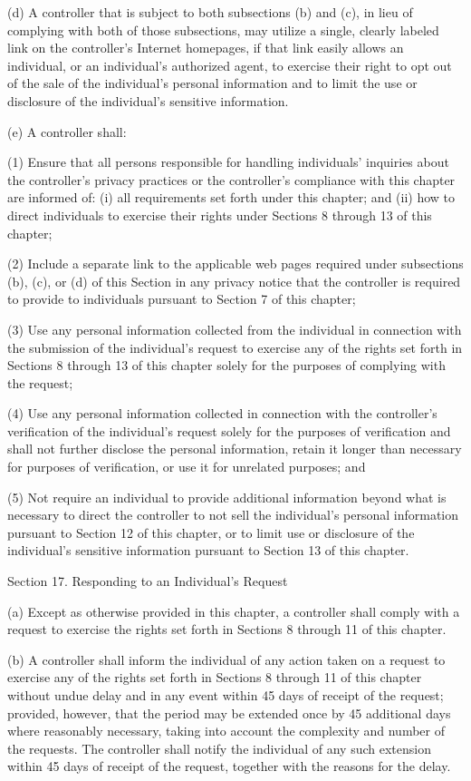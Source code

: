 (d) A controller that is subject to both subsections (b) and (c), in lieu of complying with both of those subsections, may utilize a single, clearly labeled link on the controller’s Internet homepages, if that link easily allows an individual, or an individual’s authorized agent, to exercise their right to opt out of the sale of the individual’s personal information and to limit the use or disclosure of the individual’s sensitive information. 

(e) A controller shall:

(1) Ensure that all persons responsible for handling individuals’ inquiries about the controller’s privacy practices or the controller’s compliance with this chapter are informed of: (i) all requirements set forth under this chapter; and (ii) how to direct individuals to exercise their rights under Sections 8 through 13 of this chapter;

(2) Include a separate link to the applicable web pages required under subsections (b), (c), or (d) of this Section in any privacy notice that the controller is required to provide to individuals pursuant to Section 7 of this chapter;

(3) Use any personal information collected from the individual in connection with the submission of the individual’s request to exercise any of the rights set forth in Sections 8 through 13 of this chapter solely for the purposes of complying with the request;

(4) Use any personal information collected in connection with the controller’s verification of the individual’s request solely for the purposes of verification and shall not further disclose the personal information, retain it longer than necessary for purposes of verification, or use it for unrelated purposes; and

(5) Not require an individual to provide additional information beyond what is necessary to direct the controller to not sell the individual’s personal information pursuant to Section 12 of this chapter, or to limit use or disclosure of the individual’s sensitive information pursuant to Section 13 of this chapter.

Section 17. Responding to an Individual’s Request

(a) Except as otherwise provided in this chapter, a controller shall comply with a request to exercise the rights set forth in Sections 8 through 11 of this chapter.

(b) A controller shall inform the individual of any action taken on a request to exercise any of the rights set forth in Sections 8 through 11 of this chapter without undue delay and in any event within 45 days of receipt of the request; provided, however, that the period may be extended once by 45 additional days where reasonably necessary, taking into account the complexity and number of the requests. The controller shall notify the individual of any such extension within 45 days of receipt of the request, together with the reasons for the delay.


